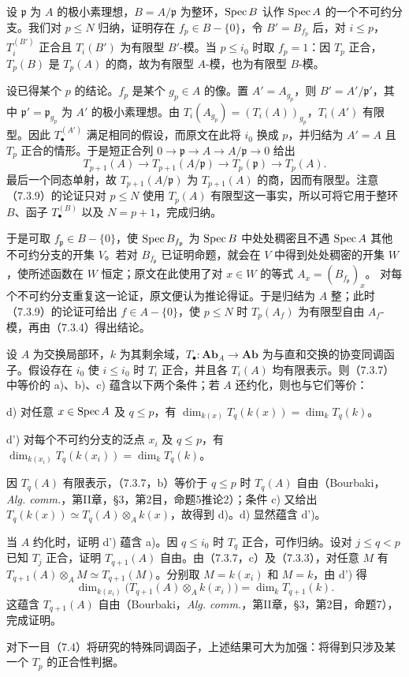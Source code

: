 设 $\mathfrak p$ 为 $A$ 的极小素理想，$B=A/\mathfrak p$ 为整环，$\operatorname{Spec} B$ 认作 $\operatorname{Spec} A$ 的一个不可约分支。我们对 $p\leq N$ 归纳，证明存在 $f_p\in B-\{0\}$，令 $B'=B_{f_p}$ 后，对 $i\leq p$，$T_i^{(B')}$ 正合且 $T_i(B')$ 为有限型 $B'$-模。当 $p\leq i_0$ 时取 $f_p=1$：因 $T_p$ 正合，$T_p(B)$ 是 $T_p(A)$ 的商，故为有限型 $A$-模，也为有限型 $B$-模。

设已得某个 $p$ 的结论。$f_p$ 是某个 $g_p\in A$ 的像。置 $A'=A_{g_p}$，则 $B'=A'/\mathfrak p'$，其中 $\mathfrak p'=\mathfrak p_{g_p}$ 为 $A'$ 的极小素理想。由 $T_i(A_{g_p})=(T_i(A))_{g_p}$，$T_i(A')$ 有限型。因此 $T_\bullet^{(A')}$ 满足相同的假设，而原文在此将 $i_0$ 换成 $p$，并归结为 $A'=A$ 且 $T_p$ 正合的情形。于是短正合列 $0\to\mathfrak p\to A\to A/\mathfrak p\to0$ 给出
\[
 T_{p+1}(A)\longrightarrow T_{p+1}(A/\mathfrak p)
 \longrightarrow T_p(\mathfrak p)\longrightarrow T_p(A).
\]
最后一个同态单射，故 $T_{p+1}(A/\mathfrak p)$ 为 $T_{p+1}(A)$ 的商，因而有限型。注意（7.3.9）的论证只对 $p\leq N$ 使用 $T_p(A)$ 有限型这一事实，所以可将它用于整环 $B$、函子 $T_\bullet^{(B)}$ 以及 $N=p+1$，完成归纳。

于是可取 $f_{\mathfrak p}\in B-\{0\}$，使 $\operatorname{Spec} B_{f_{\mathfrak p}}$ 为 $\operatorname{Spec} B$ 中处处稠密且不遇 $\operatorname{Spec} A$ 其他不可约分支的开集 $V$。若对 $B_{f_{\mathfrak p}}$ 已证明命题，就会在 $V$ 中得到处处稠密的开集 $W$，使所述函数在 $W$ 恒定；原文在此使用了对 $x\in W$ 的等式 $A_x=(B_{f_{\mathfrak p}})_x$。
对每个不可约分支重复这一论证，原文便认为推论得证。于是归结为 $A$ 整；此时（7.3.9）的论证可给出 $f\in A-\{0\}$，使 $p\leq N$ 时 $T_p(A_f)$ 为有限型自由 $A_f$-模，再由（7.3.4）得出结论。

设 $A$ 为交换局部环，$k$ 为其剩余域，$T_\bullet:\mathbf{Ab}_A\to\mathbf{Ab}$ 为与直和交换的协变同调函子。假设存在 $i_0$ 使 $i\leq i_0$ 时 $T_i$ 正合，并且各 $T_i(A)$ 均有限表示。则（7.3.7）中等价的 a)、b)、c) 蕴含以下两个条件；若 $A$ 还约化，则也与它们等价：

\noindent d) 对任意 $x\in\operatorname{Spec} A$ 及 $q\leq p$，有 $\dim_{k(x)}T_q(k(x))=\dim_kT_q(k)$。

\noindent d') 对每个不可约分支的泛点 $x_i$ 及 $q\leq p$，有 $\dim_{k(x_i)}T_q(k(x_i))=\dim_kT_q(k)$。

因 $T_q(A)$ 有限表示，（7.3.7，b）等价于 $q\leq p$ 时 $T_q(A)$ 自由（Bourbaki，\textit{Alg. comm.}，第II章，§3，第2目，命题5推论2）；条件 c) 又给出 $T_q(k(x))\simeq T_q(A)\otimes_A k(x)$，故得到 d)。d) 显然蕴含 d')。

当 $A$ 约化时，证明 d') 蕴含 a)。因 $q\leq i_0$ 时 $T_q$ 正合，可作归纳。设对 $j\leq q<p$ 已知 $T_j$ 正合，证明 $T_{q+1}(A)$ 自由。由（7.3.7，c）及（7.3.3），对任意 $M$ 有 $T_{q+1}(A)\otimes_A M\simeq T_{q+1}(M)$。分别取 $M=k(x_i)$ 和 $M=k$，由 d') 得
\[
 \dim_{k(x_i)}\bigl(T_{q+1}(A)\otimes_A k(x_i)\bigr)
 =\dim_kT_{q+1}(k).
\]
这蕴含 $T_{q+1}(A)$ 自由（Bourbaki，\textit{Alg. comm.}，第II章，§3，第2目，命题7），完成证明。

对下一目（7.4）将研究的特殊同调函子，上述结果可大为加强：将得到只涉及某一个 $T_p$ 的正合性判据。
